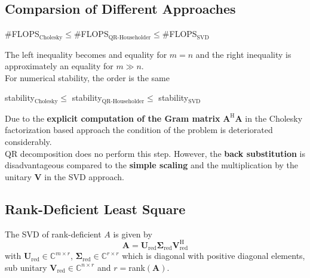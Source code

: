 \documentclass[english]{latex4ei/latex4ei_sheet}
\begin{document}
\begin{sectionbox}
    \subsection{Comparsion of Different Approaches}
    \begin{emphbox}
        \large \#FLOPS$_{\text{Cholesky}} \leq$\#FLOPS$_{\text{QR-Householder}}\leq$\#FLOPS$_{\text{SVD}}$
    \end{emphbox}
    The left inequality becomes and equality for $m=n$ and the right inequality is approximately an equality for $m\gg n$.\\
    For numerical stability, the order is the same
    \begin{emphbox}
        \large stability$_{\text{Cholesky}} \leq$ stability$_{\text{QR-Householder}}\leq$ stability$_{\text{SVD}}$
    \end{emphbox}
    Due to the \textbf{explicit computation of the Gram matrix} $\mathbf{A}^\text{H}\mathbf{A}$ in the Cholesky factorization based approach the condition of the problem is deteriorated considerably.\\
    QR decomposition does no perform this step. However, the \textbf{back substitution} is disadvantageous compared to the \textbf{simple scaling} and the multiplication by the unitary $\mathbf{V}$ in the SVD approach.
\end{sectionbox}
\begin{sectionbox}
    \subsection{Rank-Deficient Least Square}
    The SVD of rank-deficient $A$ is given by
    $$\mathbf{A} = \mathbf{U}_{\text{red}}\mathbf{\Sigma}_{\text{red}}\mathbf{V}^\text{H}_{\text{red}}$$
    with $\mathbf{U}_{\text{red}}\in\mathbb{C}^{m\times r}$, $\mathbf{\Sigma}_{\text{red}}\in\mathbb{C}^{r \times r}$ which is diagonal with positive diagonal elements, sub unitary $\mathbf{V}_{\text{red}} \in \mathbb{C}^{n \times r}$ and $r=$rank$(\mathbf{A})$.
\end{sectionbox}
\end{document}
